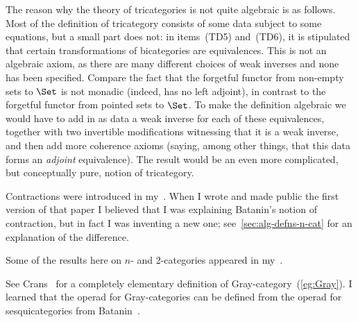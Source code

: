 The reason why the theory of tricategories is not quite algebraic is as
follows.  Most of the definition of tricategory consists of some data
subject to some equations, but a small part does not: in items~(TD5)
and~(TD6), it is stipulated that certain transformations of bicategories
are equivalences.  This is not an algebraic axiom, as there are many
different choices of weak inverses and none has been specified.  Compare
the fact that the forgetful functor from non-empty sets to $\Set$ is not
monadic%
%
%
(indeed, has no left adjoint), in contrast to the forgetful functor
from pointed sets to $\Set$.  To make the definition algebraic we would
have to add in as data a weak inverse for each of these equivalences,
together with two invertible modifications witnessing that it is a weak
inverse, and then add more coherence axioms (saying, among other things,
that this data forms an \emph{adjoint} equivalence).  The result would be
an even more complicated, but conceptually pure, notion of tricategory.%
%
%
%
%











\begin{notes}

Contractions were introduced in my~\cite{SHDCT}.  When I wrote and made
public the first version of that paper I believed that I was explaining
Batanin's notion of contraction,%
%
%
but in fact I was inventing a new one;
see~\ref{sec:alg-defns-n-cat} for an explanation of the difference.  

Some of the results here on $n$- and 2-categories appeared in
my~\cite{OHDCT}.  

See Crans~\cite[2.3]{CraTPG}%
%
%
for a completely elementary definition of
Gray-category~(\ref{eg:Gray}).%
%
%
 I learned that the operad for
Gray-categories can be defined from the operad for sesquicategories from
Batanin~\cite[p.~94]{BatMGC}.%
%
%
 


\end{notes}
